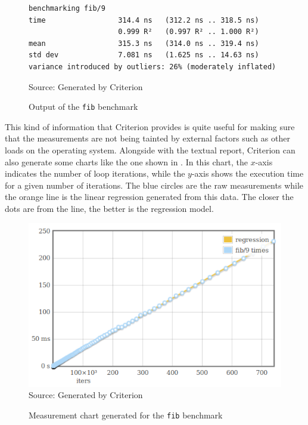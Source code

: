 \begin{figure}[htp]
  \centering
  \caption{Output of the \texttt{fib} benchmark}
  \begin{verbatim}
benchmarking fib/9
time                 314.4 ns   (312.2 ns .. 318.5 ns)
                     0.999 R²   (0.997 R² .. 1.000 R²)
mean                 315.3 ns   (314.0 ns .. 319.4 ns)
std dev              7.081 ns   (1.625 ns .. 14.63 ns)
variance introduced by outliers: 26% (moderately inflated)
  \end{verbatim}
  \footnotesize{Source: Generated by Criterion}
  \label{fig:fib-output}
\end{figure}

This kind of information that Criterion provides is quite useful for making sure that the measurements are not being tainted by external factors such as other loads on the operating system. Alongside with the textual report, Criterion can also generate some charts like the one shown in . In this chart, the $x$-axis indicates the number of loop iterations, while the $y$-axis shows the execution time for a given number of iterations. The blue circles are the raw measurements while the orange line is the linear regression generated from this data. The closer the dots are from the line, the better is the regression model.

\begin{figure}[htp]
  \centering
  \caption{Measurement chart generated for the \texttt{fib} benchmark}
  \includegraphics[width=.6\columnwidth]{images/criterion-chart} \\
  \footnotesize{Source: Generated by Criterion}
  \label{fig:crit-chart}
\end{figure}


